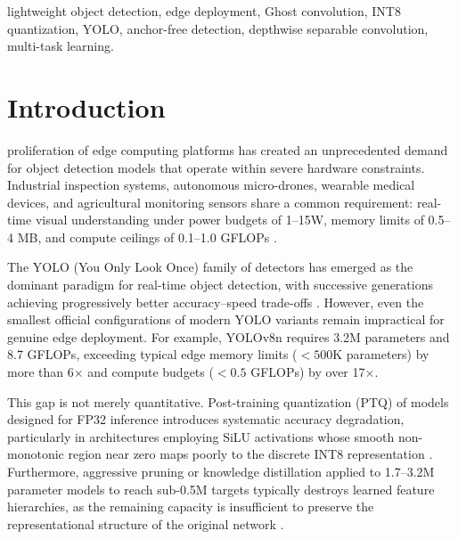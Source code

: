 \documentclass[journal]{IEEEtran}
\begin{document}
\begin{IEEEkeywords}
lightweight object detection, edge deployment, Ghost convolution, INT8 quantization, YOLO, anchor-free detection, depthwise separable convolution, multi-task learning.
\end{IEEEkeywords}

\section{Introduction}
 proliferation of edge computing platforms has created an unprecedented demand for object detection models that operate within severe hardware constraints. Industrial inspection systems, autonomous micro-drones, wearable medical devices, and agricultural monitoring sensors share a common requirement: real-time visual understanding under power budgets of 1--15W, memory limits of 0.5--4 MB, and compute ceilings of 0.1--1.0 GFLOPs \cite{zhou2019edge, li2020edge}.

The YOLO (You Only Look Once) family of detectors has emerged as the dominant paradigm for real-time object detection, with successive generations achieving progressively better accuracy--speed trade-offs \cite{redmon2016you, redmon2017yolo9000, redmon2018yolov3, bochkovskiy2020yolov4, ge2021yolox, li2022yolov6, wang2023yolov7, jocher2023yolov8, wang2024yolov10, tian2025yolo12, shao2025yolo26}. However, even the smallest official configurations of modern YOLO variants remain impractical for genuine edge deployment. For example, YOLOv8n requires 3.2M parameters and 8.7 GFLOPs, exceeding typical edge memory limits ($<500$K parameters) by more than 6$\times$ and compute budgets ($<0.5$ GFLOPs) by over 17$\times$.

This gap is not merely quantitative. Post-training quantization (PTQ) of models designed for FP32 inference introduces systematic accuracy degradation, particularly in architectures employing SiLU activations whose smooth non-monotonic region near zero maps poorly to the discrete INT8 representation \cite{krishnamoorthi2018quantizing, nagel2021white}. Furthermore, aggressive pruning or knowledge distillation applied to 1.7--3.2M parameter models to reach sub-0.5M targets typically destroys learned feature hierarchies, as the remaining capacity is insufficient to preserve the representational structure of the original network \cite{liu2019rethinking, he2019filter}.
\end{document}
